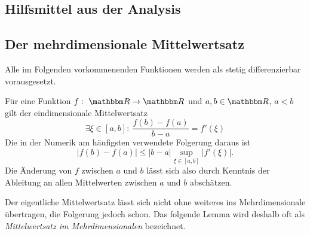 \documentclass[12pt,a4paper]{book}
\theoremstyle{break}
\theoremstyle{nonumberplain}
\newcommand{\R}{\mathbbm R}
\newcommand{\1}{\mathbbm{1}} 			      	%
\begin{document}
\begin{appendix} 

\chapter{Hilfsmittel aus der Analysis}

\section{Der mehrdimensionale Mittelwertsatz}
Alle im Folgenden vorkommenenden Funktionen werden als stetig differenzierbar vorausgesetzt.

Für eine Funktion $f:\ \R\to \R$ und $a,b\in \R$, $a<b$ gilt der eindimensionale
Mittelwertsatz 
\[
\exists \xi\in [a,b]:\ \frac{f(b)-f(a)}{b-a}=f'(\xi)
\]
Die in der Numerik am häufigsten verwendete Folgerung daraus ist
\[
|f(b)-f(a)|\leq |b-a| \sup_{\xi \in [a,b]} |f'(\xi)|.
\]
Die Änderung von $f$ zwischen $a$ und $b$ lässt sich also durch Kenntnis der Ableitung
an allen Mittelwerten zwischen $a$ und $b$ abschätzen.

Der eigentliche Mittelwertsatz lässt sich nicht ohne weiteres ins Mehrdimensionale übertragen, die Folgerung
jedoch schon. Das folgende Lemma wird deshalb oft als \emph{Mittelwertsatz im Mehrdimensionalen}
bezeichnet.


\end{appendix}
\end{document}
